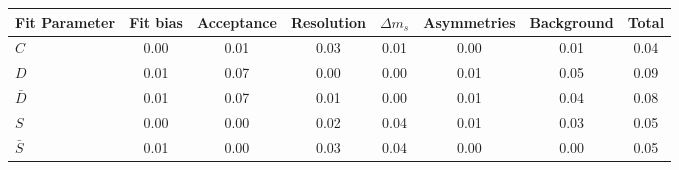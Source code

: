 \begin{tabular}{l  c  c  c  c  c  c  | c }
\hline
\hline
Fit Parameter & Fit bias & Acceptance & Resolution & $\Delta m_{s}$ & Asymmetries & Background &  Total  \\ 
\hline
$C$ & 0.00 & 0.01 & 0.03 & 0.01 & 0.00 & 0.01 & 0.04 \\ 
$D$ & 0.01 & 0.07 & 0.00 & 0.00 & 0.01 & 0.05 & 0.09 \\ 
$\bar{D}$ & 0.01 & 0.07 & 0.01 & 0.00 & 0.01 & 0.04 & 0.08 \\ 
$S$ & 0.00 & 0.00 & 0.02 & 0.04 & 0.01 & 0.03 & 0.05 \\ 
$\bar{S}$ & 0.01 & 0.00 & 0.03 & 0.04 & 0.00 & 0.00 & 0.05 \\ 
\hline
\hline
\end{tabular}
